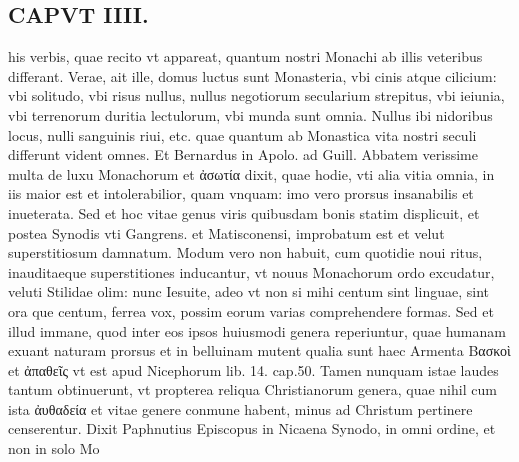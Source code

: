 \documentclass{article}
\begin{document}
\begin{pages}
\section*{CAPVT  IIII. }
\marginpar{[ p.217 ]}\pstart his verbis, quae recito vt appareat, quantum nostri Monachi ab illis veteribus differant. Verae, ait ille, domus luctus sunt Monasteria, vbi cinis atque cilicium: vbi solitudo, vbi risus nullus, nullus negotiorum secularium strepitus, vbi ieiunia, vbi terrenorum duritia lectulorum, vbi munda sunt omnia. Nullus ibi nidoribus locus, nulli sanguinis riui, etc. quae quantum ab Monastica vita nostri seculi differunt vident omnes. Et Bernardus in Apolo. ad Guill. Abbatem verissime multa de luxu Monachorum et ἀσωτία dixit, quae hodie, vti alia vitia omnia, in iis maior est et intolerabilior, quam vnquam: imo vero prorsus insanabilis et inueterata. Sed et hoc vitae genus viris quibusdam bonis statim displicuit, et postea Synodis vti Gangrens. et Matisconensi, improbatum est et velut superstitiosum damnatum. Modum vero non habuit, cum quotidie noui ritus, inauditaeque superstitiones inducantur, vt nouus Monachorum ordo excudatur, veluti Stilidae olim: nunc Iesuite, adeo vt non si mihi centum sint linguae, sint ora que centum, ferrea vox, possim eorum varias comprehendere formas. Sed et illud immane, quod inter eos ipsos huiusmodi genera reperiuntur, quae humanam exuant naturam prorsus et in belluinam mutent qualia sunt haec Armenta Bασκοὶ et ἀπαθεῖς vt est apud Nicephorum lib.  14. cap.50. Tamen nunquam istae laudes tantum obtinuerunt, vt propterea reliqua Christianorum genera, quae nihil cum ista ἀυθαδεία et vitae genere conmune habent, minus ad Christum pertinere censerentur. Dixit Paphnutius Episcopus in Nicaena Synodo, in omni ordine, et non in solo Mo\pend

\end{pages}
\end{document}
